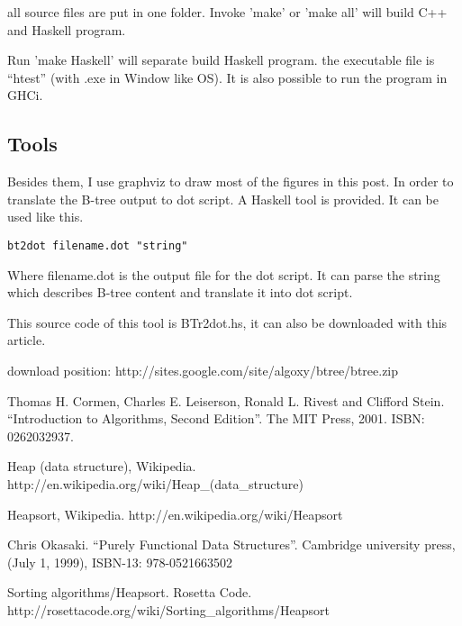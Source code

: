\documentclass{article}
\begin{document}
all source files are put in one folder. Invoke 'make' or 'make all'
will build C++ and Haskell program. 

Run 'make Haskell' will separate build Haskell program. the executable
file is ``htest'' (with .exe
in Window like OS). It is also possible to run the program in GHCi.

\subsection{Tools}

Besides them, I use graphviz to draw most of the figures in this post. In order to
translate the B-tree output to dot script. A Haskell tool is provided.
It can be used like this.

\begin{verbatim}
bt2dot filename.dot "string"
\end{verbatim}

Where filename.dot is the output file for the dot script. It can
parse the string which describes B-tree content and translate it 
into dot script.

This source code of this tool is BTr2dot.hs, it can also be downloaded 
with this article.

download position: http://sites.google.com/site/algoxy/btree/btree.zip

\begin{thebibliography}{99}

Thomas H. Cormen, Charles E. Leiserson, Ronald L. Rivest and Clifford Stein. ``Introduction to Algorithms, Second Edition''. The MIT Press, 2001. ISBN: 0262032937.

Heap (data structure), Wikipedia. http://en.wikipedia.org/wiki/Heap\_(data\_structure)

Heapsort, Wikipedia. http://en.wikipedia.org/wiki/Heapsort

Chris Okasaki. ``Purely Functional Data Structures''. Cambridge university press, (July 1, 1999), ISBN-13: 978-0521663502

Sorting algorithms/Heapsort. Rosetta Code. http://rosettacode.org/wiki/Sorting\_algorithms/Heapsort

\end{thebibliography}

\ifx\wholebook\relax \else
\end{document}
